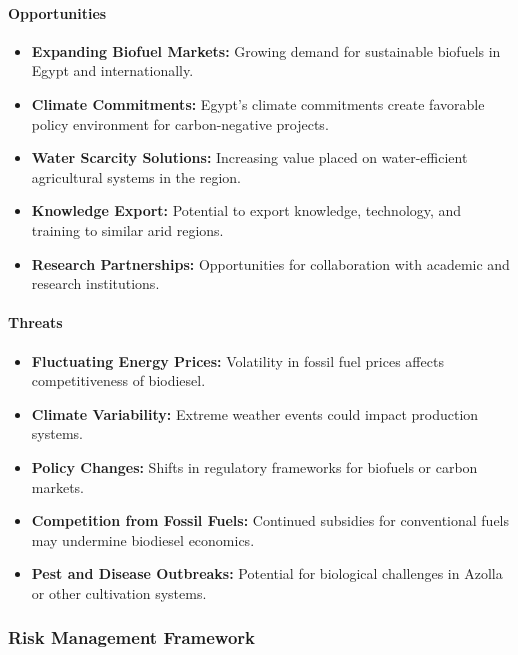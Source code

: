 \paragraph{Opportunities}
\begin{itemize}
    \item \textbf{Expanding Biofuel Markets:} Growing demand for sustainable biofuels in Egypt and internationally.
    \item \textbf{Climate Commitments:} Egypt's climate commitments create favorable policy environment for carbon-negative projects.
    \item \textbf{Water Scarcity Solutions:} Increasing value placed on water-efficient agricultural systems in the region.
    \item \textbf{Knowledge Export:} Potential to export knowledge, technology, and training to similar arid regions.
    \item \textbf{Research Partnerships:} Opportunities for collaboration with academic and research institutions.
\end{itemize}

\paragraph{Threats}
\begin{itemize}
    \item \textbf{Fluctuating Energy Prices:} Volatility in fossil fuel prices affects competitiveness of biodiesel.
    \item \textbf{Climate Variability:} Extreme weather events could impact production systems.
    \item \textbf{Policy Changes:} Shifts in regulatory frameworks for biofuels or carbon markets.
    \item \textbf{Competition from Fossil Fuels:} Continued subsidies for conventional fuels may undermine biodiesel economics.
    \item \textbf{Pest and Disease Outbreaks:} Potential for biological challenges in Azolla or other cultivation systems.
\end{itemize}

\subsubsection{Risk Management Framework}

